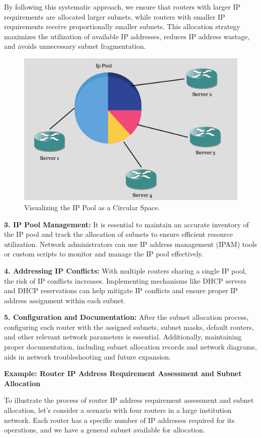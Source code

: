 By following this systematic approach, we ensure that routers with larger IP requirements are allocated larger subnets, while routers with smaller IP requirements receive proportionally smaller subnets. This allocation strategy maximizes the utilization of available IP addresses, reduces IP address wastage, and avoids unnecessary subnet fragmentation.
\begin{figure}[h]
  \centering
  \includegraphics[width=0.5\linewidth]{Images/Pool.png}
  \caption{Visualizing the IP Pool as a Circular Space.}
\end{figure}

\textbf{3. IP Pool Management:} It is essential to maintain an accurate inventory of the IP pool and track the allocation of subnets to ensure efficient resource utilization. Network administrators can use IP address management (IPAM) tools or custom scripts to monitor and manage the IP pool effectively.

\textbf{4. Addressing IP Conflicts:} With multiple routers sharing a single IP pool, the risk of IP conflicts increases. Implementing mechanisms like DHCP servers and DHCP reservations can help mitigate IP conflicts and ensure proper IP address assignment within each subnet.

\textbf{5. Configuration and Documentation:} After the subnet allocation process, configuring each router with the assigned subnets, subnet masks, default routers, and other relevant network parameters is essential. Additionally, maintaining proper documentation, including subnet allocation records and network diagrams, aids in network troubleshooting and future expansion.



\textbf{Example: Router IP Address Requirement Assessment and Subnet Allocation}

To illustrate the process of router IP address requirement assessment and subnet allocation, let's consider a scenario with four routers in a large institution network. Each router has a specific number of IP addresses required for its operations, and we have a general subnet available for allocation.


